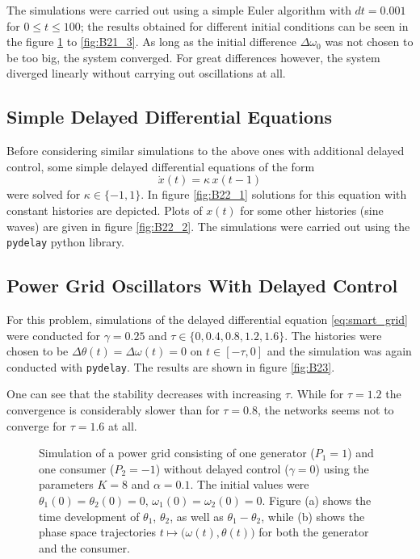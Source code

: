 \documentclass{scrartcl}
\begin{document}
The simulations were carried out using a simple Euler algorithm with
$dt=0.001$ for $0 \le t \le 100$; the results obtained for different
initial conditions can be seen in the figure \ref{fig:B21_1} to \ref{fig:B21_3}.
As long as the initial difference $\Delta\omega_0$ was not chosen to be too
big, the system converged. For great differences however, the system
diverged linearly without carrying out oscillations at all.


\subsection{Simple Delayed Differential Equations}
Before considering similar simulations to the above ones with additional
delayed control, some simple delayed differential equations of the form
\begin{equation}\label{eq:simple_dde}
    \dot{x}(t) = \kappa\,x(t - 1)
\end{equation}
were solved for $\kappa\in\{-1, 1\}$. In figure \ref{fig:B22_1} solutions
for this equation with constant histories are depicted. Plots of $x(t)$
for some other histories (sine waves) are given in figure \ref{fig:B22_2}.
The simulations were carried out using the \texttt{pydelay} python library.

\subsection{Power Grid Oscillators With Delayed Control}
For this problem, simulations of the delayed differential equation
\eqref{eq:smart_grid} were conducted for $\gamma = 0.25$ and $\tau\in\{0, 0.4,
0.8, 1.2, 1.6\}$. The histories were chosen to be $\Delta\theta(t)
= \Delta\omega(t) = 0$ on $t\in[-\tau, 0]$ and the simulation was again
conducted with \texttt{pydelay}. The results are shown in figure
\ref{fig:B23}.

One can see that the stability decreases with increasing $\tau$. While for
$\tau = 1.2$ the convergence is considerably slower than for $\tau = 0.8$,
the networks seems not to converge for $\tau = 1.6$ at all.





\begin{figure}[h]
    \centering
    \caption{Simulation of a power grid consisting of one generator ($P_1
    = 1$) and one consumer ($P_2 = -1$) without delayed control ($\gamma
    = 0$) using the parameters $K=8$ and $\alpha=0.1$. The initial values
    were $\theta_1(0) = \theta_2(0) = 0$,
    $\omega_1(0) = \omega_2(0) = 0$. Figure (a) shows the time development of
    $\theta_1$, $\theta_2$, as well as $\theta_1 - \theta_2$, while (b) shows
    the phase space trajectories $t\mapsto \big(\omega(t), \theta(t)\big)$ for
    both the generator and the consumer.}
    \label{fig:B21_1}
\end{figure}
\end{document}
